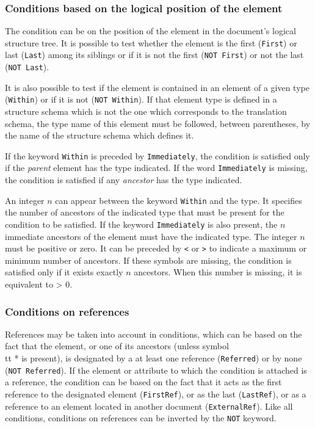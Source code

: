\subsubsection{Conditions based on the logical position of the element}

The condition can be on the position of the element in the document's
logical structure tree.  It is possible to test whether the element is
the first ({\tt First}) or last ({\tt Last}) among its siblings or if
it is not the first ({\tt NOT First}) or not the last ({\tt NOT
Last}).

It is also possible to test if the element is contained in an
element of a given type ({\tt Within}) or if it is not ({\tt NOT Within}).
If that element type is defined in a structure schema which is
not the one which corresponds to the translation schema, the type name
of this element must be followed, between parentheses, by the name of
the structure schema which defines it.

If the keyword
{\tt Within} is preceded by {\tt Immediately}, the condition is
satisfied only if the {\em parent} element has the type indicated.
If the word {\tt Immediately} is missing, the condition is satisfied
if any {\em ancestor} has the type indicated.

An integer $n$ can appear between the keyword {\tt Within} and the
type.  It specifies the number of ancestors of the indicated type that must
be present for the condition to be satisfied.  If the keyword
{\tt Immediately} is also present, the $n$ immediate ancestors of the
element must have the indicated type.  The integer $n$ must be positive
or zero.  It can be preceded by {\tt <} or {\tt >} to indicate a maximum
or minimum number of ancestors.  If these symbols are missing, the
condition is satisfied only if it exists exactly $n$ ancestors.  When
this number is missing, it is equivalent to > 0.

\subsubsection{Conditions on references}

References may be taken into account in conditions, which can be based
on the fact that the element, or one of its ancestors (unless symbol
{\\tt *} is present), is designated
by a at least one reference ({\tt Referred}) or by none ({\tt NOT
Referred}).  If the element or attribute to which the condition is
attached is a reference, the condition can be based on the fact that
it acts as the first reference to the designated element ({\tt FirstRef}),
or as the last ({\tt LastRef}), or as a reference to an element located in
another document ({\tt ExternalRef}).  Like all conditions, conditions
on references can be inverted by the {\tt NOT} keyword.


